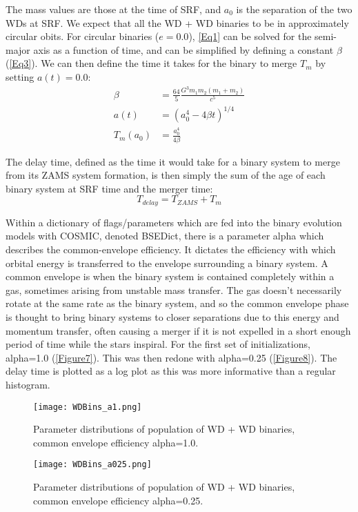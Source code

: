 \documentclass[12pt]{article}
\begin{document}
The mass values are those at the time of SRF, and $a_0$ is the separation of the two WDs at SRF. We expect that all the WD + WD binaries to be in approximately circular obits. For circular binaries ($e=0.0$), \autoref{Eq1} can be solved for the semi-major axis as a function of time, and can be simplified by defining a constant $\beta$ (\autoref{Eq3}). We can then define the time it takes for the binary to merge $T_m$ by setting $a(t)=0.0$:
\begin{align}
    \beta &= \frac{64}{5}\frac{G^3m_1m_2(m_1+m_2)}{c^5} \label{Eq3}\\
    a(t) &= (a_0^4 - 4\beta t)^{1/4} \label{Eq.2} \\
    T_m(a_0) &= \frac{a_0^4}{4\beta}
\end{align}

The delay time, defined as the time it would take for a binary system to merge from its ZAMS system formation, is then simply the sum of the age of each binary system at SRF time and the merger time:
$$T_{delay} = T_{ZAMS} + T_m $$

Within a dictionary of flags/parameters which are fed into the binary evolution models with COSMIC, denoted BSEDict, there is a parameter alpha which describes the common-envelope efficiency. It dictates the efficiency with which orbital energy is transferred to the envelope surrounding a binary system. A common envelope is when the binary system is contained completely within a gas, sometimes arising from unstable mass transfer. The gas doesn't necessarily rotate at the same rate as the binary system, and so the common envelope phase is thought to bring binary systems to closer separations due to this energy and momentum transfer, often causing a merger if it is not expelled in a short enough period of time while the stars inspiral. For the first set of initializations, alpha=1.0 (\autoref{Figure7}). This was then redone with alpha=0.25 (\autoref{Figure8}). The delay time is plotted as a log plot as this was more informative than a regular histogram.
\begin{figure}
    \centering
    \texttt{[image: WDBins\_a1.png]}
    \caption{Parameter distributions of population of WD + WD binaries, common envelope efficiency alpha=1.0.}
    \label{Figure7}
\end{figure}
\begin{figure}
    \centering
    \texttt{[image: WDBins\_a025.png]}
    \caption{Parameter distributions of population of WD + WD binaries, common envelope efficiency alpha=0.25.}
    \label{Figure8}
\end{figure} 
\end{document}
